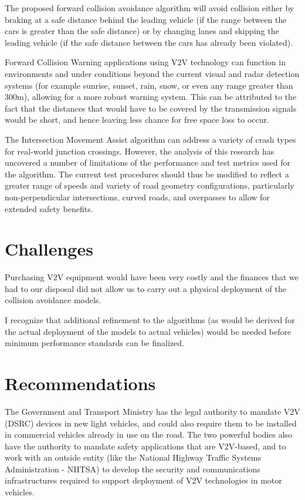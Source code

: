 \documentclass[12pt]{report}
\begin{document}
The proposed forward collision avoidance algorithm will avoid collision either by braking at a safe distance behind the leading vehicle (if the range between the cars is greater than the safe distance) or by changing lanes and skipping the leading vehicle (if the safe distance between the cars has already been violated).

Forward Collision Warning applications using V2V technology can function in environments and under conditions beyond the current visual and radar detection systems (for example sunrise, sunset, rain, snow, or even any range greater than 300m), allowing for a more robust warning system. This can be attributed to the fact that the distances that would have to be covered by the transmission signals would be short, and hence leaving less chance for free space loss to occur. 

The Intersection Movement Assist algorithm can address a variety of crash types for real-world junction crossings. However, the analysis of this research has uncovered a number of limitations of the performance and test metrics used for the algorithm.
The current test procedures should thus be modified to reflect a greater range of speeds and variety of road geometry configurations, particularly non-perpendicular intersections, curved roads, and overpasses to allow for extended safety benefits. 


\section{Challenges}
Purchasing V2V equipment would have been very costly and the finances that we had to our disposal did not allow us to carry out a physical deployment of the collision avoidance models.

I recognize that additional refinement to the algorithms (as would be derived for the actual deployment of the models to actual vehicles) would be needed before minimum performance standards can be finalized.

\section{Recommendations}
The Government and Transport Ministry has the legal authority to mandate V2V (DSRC) devices in new light vehicles, and could also require them to be installed in commercial vehicles already in use on the road. The two powerful bodies also have the authority to mandate safety applications that are V2V-based, and to work with an outside entity (like the National Highway Traffic Systems Administration - NHTSA) to develop the security and communications infrastructures required to support deployment of V2V technologies in motor vehicles.
\end{document}

